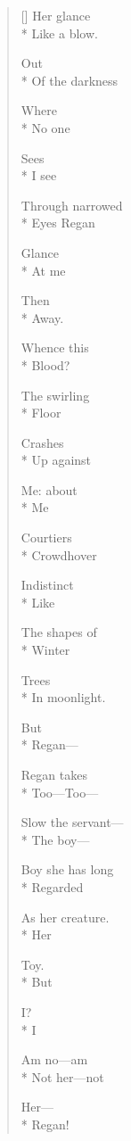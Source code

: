\label{ch:lear_ar}
\begin{verse}[\versewidth]
\qquad Her glance\\*
Like a blow.

\qquad \qquad Out\\*
Of the darkness

Where\\*
No one

Sees\\*
I see

Through narrowed\\*
Eyes Regan

Glance\\*
At me

\qquad \qquad Then\\*
Away.

\hspace*{3\vgap} Whence this\\*
Blood?

The swirling\\*
Floor

Crashes\\*
Up against

Me: about\\*
Me

Courtiers\\*
Crowd\qquad \qquad hover

Indistinct\\*
\qquad \qquad Like

The shapes of\\*
Winter

Trees\\*
In moonlight.

\qquad \qquad But\\*
Regan---

Regan takes\\*
Too---Too---

Slow the servant---\\*
The boy---

Boy she has long\\*
Regarded

As her creature.\\*
Her

Toy.\\*
But

I?\\*
I

Am no---am\\*
Not her---not

Her---\\*
\qquad Regan!
\end{verse}
